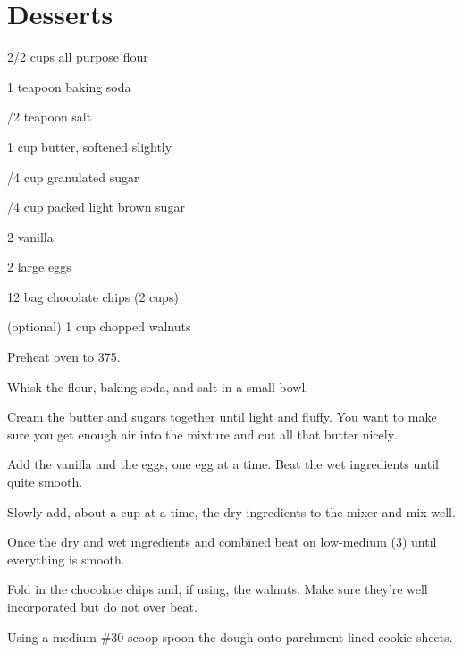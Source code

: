 
\chapter{Desserts}


%
%
%
%
\newpage



\begin{IngredientsAndSteps}
    \ListIngredientsAndSteps
    {
        2/2 cups all purpose flour

        1 teapoon baking soda

        /2 teapoon salt

        \IngredientsSeparatorClear

        1 cup butter, softened slightly

        /4 cup granulated sugar

        /4 cup packed light brown sugar

        \IngredientsSeparatorClear

        2 \tsp[s] vanilla

        2 large eggs

        12 \Ounce bag chocolate chips (2 cups)

        (optional) 1 cup chopped walnuts
    }
    {
        Preheat oven to 375\Degrees[F].

        Whisk the flour, baking soda, and salt in a small bowl.

        Cream the butter and sugars together until light and fluffy. You want to make sure you get
        enough air into the mixture and cut all that butter nicely.

        Add the vanilla and the eggs, one egg at a time. Beat the wet ingredients until quite smooth.

        Slowly add, about a cup at a time, the dry ingredients to the mixer and mix well.

        Once the dry and wet ingredients and combined beat on low-medium (3) until
        everything is smooth.

        Fold in the chocolate chips and, if using, the walnuts. Make sure they're well
        incorporated but do not over beat.

        Using a medium \#30 scoop spoon the dough onto parchment-lined cookie sheets.
    }
\end{IngredientsAndSteps}

